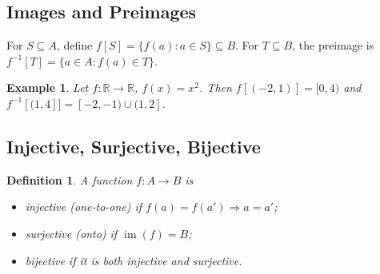 \documentclass[11pt]{article}
\newtheorem{definition}{Definition}
\newtheorem{example}{Example}
\newcommand{\R}{\mathbb{R}}
\newcommand{\im}{\operatorname{im}}
\begin{document}
\begin{center}
\end{center}

\subsection{Images and Preimages}
For $S\subseteq A$, define $f[S]=\{f(a): a\in S\}\subseteq B$. For $T\subseteq B$, the preimage is $f^{-1}[T]=\{a\in A: f(a)\in T\}$.

\begin{example}
Let $f\colon \R\to\R$, $f(x)=x^2$. Then $f[(-2,1)]=[0,4)$ and $f^{-1}[(1,4]]=[-2,-1)\cup(1,2]$.
\end{example}

\subsection{Injective, Surjective, Bijective}
\begin{definition}
A function $f\colon A\to B$ is
\begin{itemize}[leftmargin=*]
  \item \emph{injective} (one-to-one) if $f(a)=f(a')\Rightarrow a=a'$;
  \item \emph{surjective} (onto) if $\im(f)=B$;
  \item \emph{bijective} if it is both injective and surjective.
\end{itemize}
\end{definition}
\end{document}
